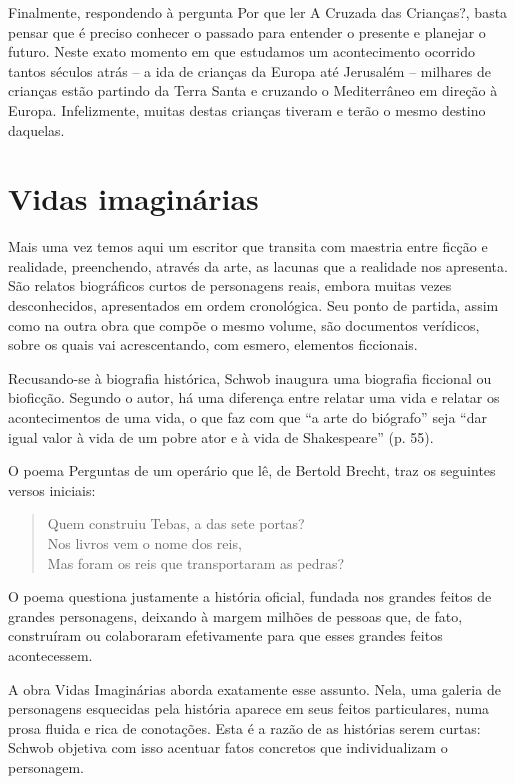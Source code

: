 \documentclass[12pt]{extarticle}
\begin{document}
Finalmente, respondendo à pergunta Por que ler A Cruzada das Crianças?,
basta pensar que é preciso conhecer o passado para entender o presente e
planejar o futuro. Neste exato momento em que estudamos um acontecimento
ocorrido tantos séculos atrás -- a ida de crianças da Europa até
Jerusalém -- milhares de crianças estão partindo da Terra Santa e
cruzando o Mediterrâneo em direção à Europa. Infelizmente, muitas destas
crianças tiveram e terão o mesmo destino daquelas.

\section{Vidas imaginárias}

Mais uma vez temos aqui um escritor que transita com maestria entre
ficção e realidade, preenchendo, através da arte, as lacunas que a
realidade nos apresenta. São relatos biográficos curtos de personagens
reais, embora muitas vezes desconhecidos, apresentados em ordem
cronológica. Seu ponto de partida, assim como na outra obra que compõe o
mesmo volume, são documentos verídicos, sobre os quais vai
acrescentando, com esmero, elementos ficcionais.

Recusando-se à biografia histórica, Schwob inaugura uma biografia
ficcional ou bioficção. Segundo o autor, há uma diferença entre relatar
uma vida e relatar os acontecimentos de uma vida, o que faz com que ``a
arte do biógrafo'' seja ``dar igual valor à vida de um pobre ator e à
vida de Shakespeare'' (p. 55).

O poema Perguntas de um operário que lê, de Bertold Brecht, traz os
seguintes versos iniciais:

\begin{verse}
Quem construiu Tebas, a das sete portas?\\
Nos livros vem o nome dos reis,\\
Mas foram os reis que transportaram as pedras?\\
\end{verse}

O poema questiona justamente a história oficial, fundada nos grandes
feitos de grandes personagens, deixando à margem milhões de pessoas que,
de fato, construíram ou colaboraram efetivamente para que esses grandes
feitos acontecessem.

A obra Vidas Imaginárias aborda exatamente esse assunto. Nela, uma
galeria de personagens esquecidas pela história aparece em seus feitos
particulares, numa prosa fluida e rica de conotações. Esta é a razão de
as histórias serem curtas: Schwob objetiva com isso acentuar fatos
concretos que individualizam o personagem.
\end{document}
